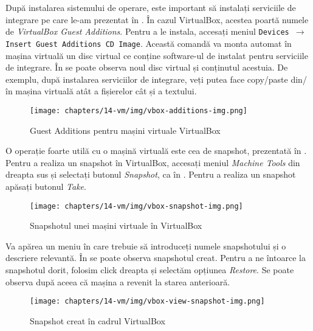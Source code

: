 După instalarea sistemului de operare, este important să instalați serviciile de
integrare pe care le-am prezentat în .
În cazul VirtualBox, acestea poartă numele de \textit{VirtualBox Guest Additions}. Pentru a le instala, accesați meniul \texttt{Devices $\rightarrow$ Insert Guest
Additions CD Image}. Această comandă va monta automat în mașina virtuală un disc
virtual ce conține software-ul de instalat pentru serviciile de integrare. În
 se poate observa noul disc virtual
și conținutul acestuia. De exemplu, după instalarea serviciilor de integrare,
veți putea face copy/paste din/în mașina virtuală atât a fișierelor cât și a
textului.

\begin{figure}[!htbp]
  \centering
  \texttt{[image: chapters/14-vm/img/vbox-additions-img.png]}
  \caption{Guest Additions pentru mașini virtuale VirtualBox}
  \label{fig:vm:vbox-additions}
\end{figure}

O operație foarte utilă cu o mașină virtuală este cea de snapshot, prezentată
în . Pentru a realiza un snapshot în
VirtualBox, accesați meniul \textit{Machine Tools} din dreapta sus și
selectați butonul \textit{Snapshot}, ca în
. Pentru a realiza un snapshot
apăsați butonul \textit{Take}.

\begin{figure}[!htbp]
  \centering
  \texttt{[image: chapters/14-vm/img/vbox-snapshot-img.png]}
  \caption{Snapshotul unei mașini virtuale în VirtualBox}
  \label{fig:vm:vbox-snapshot}
\end{figure}

Va apărea un meniu în care trebuie să introduceți numele snapshotului și o
descriere relevantă. În  se
poate observa snapshotul creat. Pentru a ne întoarce la snapshotul dorit,
folosim click dreapta și selectăm opțiunea \textit{Restore}.
Se poate observa după aceea că mașina a revenit la starea anterioară.

\begin{figure}[!htbp]
  \centering
  \texttt{[image: chapters/14-vm/img/vbox-view-snapshot-img.png]}
  \caption{Snapshot creat în cadrul VirtualBox}
  \label{fig:vm:vbox-view-snapshot}
\end{figure}

